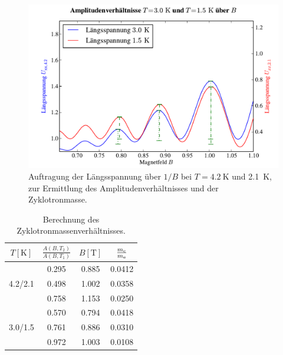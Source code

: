 \documentclass[paper=a4,fontsize=10pt,DIV=18,twocolumn,parskip=half]{scrartcl}
\numberwithin{equation}{section}    %
\begin{document}
\begin{figure}[htp]
	\begin{center}
		\includegraphics[width=\columnwidth]{Data-Plots/13-3,0-1,5-zyklotron-B.pdf}
		\caption{Auftragung der Längsspannung über $1/B$ bei $T=\SI{4.2}{\kelvin}$ und \SI{2.1}{\kelvin}, zur Ermittlung des Amplitudenverhältnisses und der Zyklotronmasse.}
		\label{fig:zyklotronmasse2}
	\end{center}
\end{figure}

\begin{table}[htp]
	\begin{center}
		\begin{tabular}{c|ccc}
			\hline
			$T[\mathrm{K}]$ & $\frac{A(B,T_2)}{A(B,T_1)}$ & $B[\mathrm{T}]$ & $\frac{m_{\rm c}}{m_{\rm e}}$\\
			\hline
			 		& 0.295 & 0.885 & 0.0412 \\
			4.2/2.1 & 0.498 & 1.002 & 0.0358 \\
			 		& 0.758 & 1.153 & 0.0250 \\
			\hline
					& 0.570 & 0.794 & 0.0418 \\
			3.0/1.5 & 0.761 & 0.886 & 0.0310 \\
					& 0.972 & 1.003 & 0.0108 \\
		\end{tabular}
		\caption{Berechnung des Zyklotronmassenverhältnisses.}
		\label{tab:zyklotronmasse}
	\end{center}
\end{table}
\end{document}
